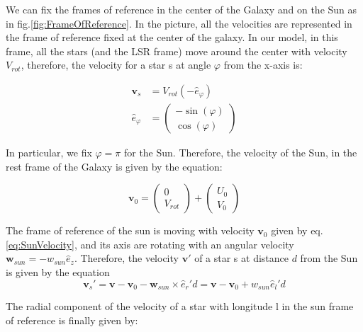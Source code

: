 \noindent
We can fix the frames of reference in the center of the Galaxy and on the Sun as in fig.\ref{fig:FrameOfReference}. In the picture, all the velocities are represented in the frame of reference fixed at the center of the galaxy. In our model, in this frame, all the stars (and the LSR frame) move around the center with velocity $V_{rot}$, therefore, the velocity for a star s at angle $\varphi$ from the x-axis is:

\begin{equation}\label{eq:VComponents}
    \begin{aligned}
        \bm{v}_s &= V_{rot} (-\hat{e}_{\varphi}) \\
        \hat{e}_{\varphi} &= \begin{pmatrix} -\sin(\varphi) \\ \cos(\varphi) \end{pmatrix}
    \end{aligned}
\end{equation}

\noindent
In particular, we fix $\varphi = \pi$ for the Sun. Therefore, the velocity of the Sun, in the rest frame of the Galaxy is given by the equation:

\begin{equation}\label{eq:VSun}
    \bm{v}_0 = \begin{pmatrix} 0 \\ V_{rot} \end{pmatrix} + \begin{pmatrix} U_0 \\ V_0 \end{pmatrix}
\end{equation}
 
\noindent
The frame of reference of the sun is moving with velocity $\bm{v}_0$ given by eq.\ref{eq:SunVelocity}, and its axis are rotating with an angular velocity $\bm{w}_{sun} = -w_{sun} \hat{e}_z$. Therefore, the velocity $\bm{v'}$ of a star s at distance $d$ from the Sun is given by the equation
\begin{equation}\label{eq:ReferenceFrame}
    \bm{v}_s' = \bm{v} - \bm{v}_0 - \bm{w}_{sun} \times \hat{e}_r' d = \bm{v} - \bm{v}_0 + w_{sun} \hat{e}_l' d
\end{equation}
\noindent 


\noindent 
The radial component of the velocity of a star with longitude l in the sun frame of reference is finally given by:

